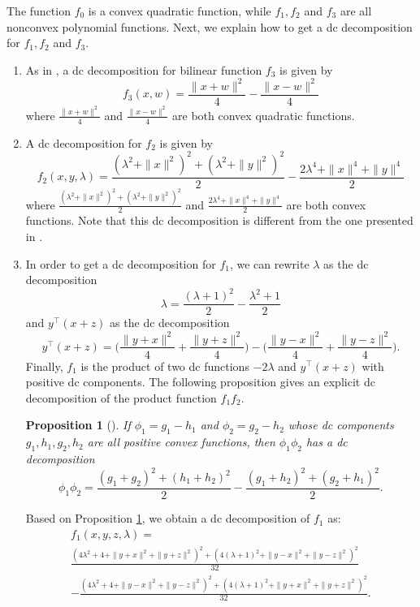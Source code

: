 \documentclass[3p]{elsarticle}
\newtheorem{prop}[thm]{Proposition}
\begin{document}
The function $f_0$ is a convex quadratic function, while $f_1,f_2$ and $f_3$ are all nonconvex polynomial functions. Next, we explain how to get a dc decomposition for $f_1,f_2$ and $f_3$.

\begin{enumerate}
	\item As in \cite{Niu15}, a dc decomposition for bilinear function $f_3$ is given by
	\begin{equation}\label{eq:dcdf3}
	f_3(x,w)= \frac{\|x+w\|^2}{4}-\frac{\|x-w\|^2}{4}
	\end{equation}
	where $\frac{\|x+w\|^2}{4}$ and $\frac{\|x-w\|^2}{4}$ are both convex quadratic functions.
	
	\item A dc decomposition for $f_2$ is given by
	\begin{equation}\label{eq:dcdf2}
	f_2(x,y,\lambda) = \frac{(\lambda^2 + \|x\|^2)^2 + (\lambda^2 + \|y\|^2)^2}{2} - \frac{2\lambda^4 + \|x\|^4 + \|y\|^4}{2}
	\end{equation}
	where $\frac{(\lambda^2 + \|x\|^2)^2 + (\lambda^2 + \|y\|^2)^2}{2}$ and $\frac{2\lambda^4 + \|x\|^4 + \|y\|^4}{2}$ are both convex functions. Note that this dc decomposition is different from the one presented in \cite{Niu15}.
	\item In order to get a dc decomposition for $f_1$, we can rewrite $\lambda$ as the dc decomposition
	\begin{equation}
	\lambda = \frac{(\lambda + 1)^2}{2} - \frac{\lambda^2+1}{2}
	\end{equation}
	and $y^{\top}(x+z)$ as the dc decomposition
	\begin{equation}
	y^{\top}(x+z) = \biggl(\frac{\|y+x\|^2}{4} + \frac{\|y+z\|^2}{4}\biggr) -  \biggl(\frac{\|y-x\|^2}{4} + \frac{\|y-z\|^2}{4}\biggr).
	\end{equation}
	Finally, $f_1$ is the product of two dc functions $-2\lambda$ and $y^{\top}(x+z)$ with positive dc components. The following proposition gives an explicit dc decomposition of the product function $f_1f_2$.
	\begin{prop}[\cite{Horst}]\label{prop:dcdecompofproduct}
		If $\phi_1=g_1-h_1$ and $\phi_2=g_2-h_2$ whose dc components $g_1,h_1,g_2,h_2$ are all positive convex functions, then $\phi_1\phi_2$ has a dc decomposition
		\[\phi_1\phi_2 = \frac{(g_1+g_2)^2 + (h_1+h_2)^2}{2} - \frac{(g_1+h_2)^2 + (g_2+h_1)^2}{2}. \] 
	\end{prop}
	Based on Proposition \ref{prop:dcdecompofproduct}, we obtain a dc decomposition of $f_1$ as:
	\begin{multline}\label{eq:dcdf1}
	f_1(x,y,z,\lambda) = \\
	\frac{(4\lambda^2+4 + \|y+x\|^2 + \|y+z\|^2)^2 + (4(\lambda+1)^2 + \|y-x\|^2 + \|y-z\|^2)^2}{32}\\
	- \frac{(4\lambda^2+4 + \|y-x\|^2 + \|y-z\|^2)^2 + (4(\lambda+1)^2 + \|y+x\|^2 + \|y+z\|^2)^2}{32}.
	\end{multline}
\end{enumerate}
\end{document}
